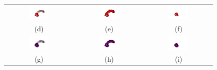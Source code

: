 \begin{figure}[h!]
\begin{center}
{\begin{tabular}{ccc}
				\includegraphics[width=0.3\textwidth]{Bulgular-Irdeleme/Figures/unpp3dmix.png} & \includegraphics[width=0.3\textwidth]{Bulgular-Irdeleme/Figures/unpp3dpan.png} & \includegraphics[width=0.3\textwidth]{Bulgular-Irdeleme/Figures/unpp3dtum.png} \\
				(d) & (e) & (f) \\
				\includegraphics[width=0.3\textwidth]{Bulgular-Irdeleme/Figures/un3dmix.png} & \includegraphics[width=0.3\textwidth]{Bulgular-Irdeleme/Figures/un3dpan.png} & \includegraphics[width=0.3\textwidth]{Bulgular-Irdeleme/Figures/un3dtum.png} \\
				(g) & (h) & (i) \\

\end{tabular}}
\end{center}
\end{figure}
